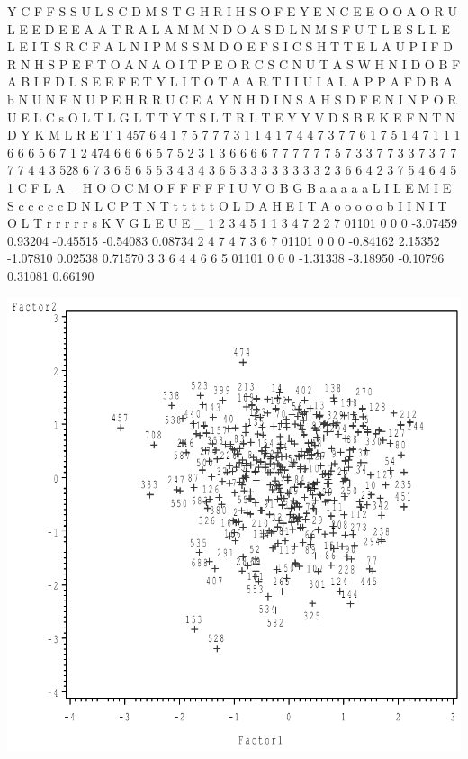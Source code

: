 \documentclass{article}
\begin{document}
\begin{Woutput}
            Y C           F         F S   S U   L       S C D M     S   T   G
      H R   I H         S O   F     E Y   E N C E       E O O A     O   R   U L
      E E D E E   A   A T R A L   A M M   N D O A S   D L N M S     F   U T L E
   S  L L E L E I T   S R C F A L N I P M S S M D O   E F S I C S H T   T E L A
   U  P I F D R N H   S P E F T O A N A O I T P E O R C S C N U T A S W H N I D
O  B  F A B I F D L S E E F E T Y L I T O T A A R T I I U I A L A P P A F D B A
b  N  U N E N U P E H R R U C E A Y N H D I N S A H S D F E N I N P O R U E L C
s  O  L T L G L T T Y T S L T R L T E Y Y V D S B E K E F N T N D Y K M L R E T
1 457 6 4 1 7 5 7 7 7 3 1 1 4 1 7 4 4 7 3 7 7 6 1 7 5 1 4 7 1 1 1 6 6 6 5 6 7 1
2 474 6 6 6 6 5 7 5 2 3 1 3 6 6 6 6 7 7 7 7 7 7 5 7 3 3 7 7 3 3 7 3 7 7 7 7 4 4
3 528 6 7 3 6 5 6 5 5 3 4 3 4 3 6 5 3 3 3 3 3 3 3 3 2 3 6 6 4 2 3 7 5 4 6 4 5 1
  C     F  L     A              _
  H     O  O  C  M              O                F         F         F         F        F
  I     U  V  O  B  G           B                a         a         a         a        a
  L  I  L  E  M  I  E           S                c         c         c         c        c
  D  N  L  C  P  T  N           T                t         t         t         t        t
O L  D  A  H  E  I  T           A                o         o         o         o        o
b I  I  N  I  T  O  L           T                r         r         r         r        r
s K  V  G  L  E  U  E           _                1         2         3         4        5
1 1  3  4  7  2  2  7  01101    0    0    0  -3.07459   0.93204  -0.45515  -0.54083  0.08734
2 4  7  4  7  3  6  7  01101    0    0    0  -0.84162   2.15352  -1.07810   0.02538  0.71570
3 3  6  4  4  6  6  5  01101    0    0    0  -1.31338  -3.18950  -0.10796   0.31081  0.66190
\end{Woutput}
\includegraphics[]{factor-1-SAS-fig.pdf}
\end{document}
